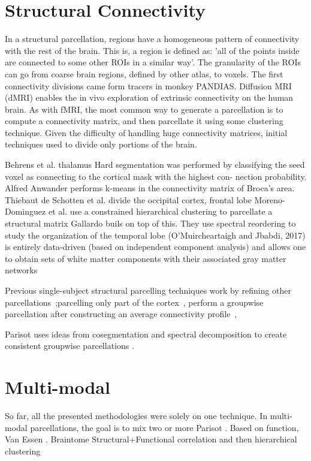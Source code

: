 \section{Structural Connectivity}
In a structural parcellation, regions have a homogeneous pattern of connectivity
with the rest of the brain. This is, a region is defined as: 'all of the points
inside are connected to some other ROIs in a similar way'. The granularity
of the ROIs can go from coarse brain regions, defined by other atlas, to voxels.
The first connectivity divisions came form tracers in monkey PANDIAS. Diffusion
MRI (dMRI) enables the in vivo exploration of extrinsic connectivity on the
human brain. As with fMRI, the most common way to generate a parcellation is
to compute a connectivity matrix, and then parcellate it using some clustering
technique. Given the difficulty of handling huge connectivity matrices, initial
techniques used to divide only portions of the brain.

Behrens et al.\cite{Behrens2003} thalamus Hard segmentation was performed by classifying the seed voxel as connecting to the cortical mask with the highest con- nection probability.
Alfred Anwander performs k-means\cite{Anwander2006} in the connectivity matrix of Broca's area.
Thiebaut de Schotten et al. divide the occipital cortex\cite{ThiebautdeSchotten2014}, frontal lobe \cite{ThiebautdeSchotten2016}
Moreno-Dominguez et al. use a constrained hierarchical clustering to parcellate a structural matrix \cite{Moreno-Dominguez2014}
Gallardo buils on top of this.
They use spectral reordering to study the organization of the temporal lobe \cite{Bajada2017}
(O'Muircheartaigh and Jbabdi, 2017) is entirely data-driven (based on independent component analysis) and allows one to obtain sets of white matter components with their associated gray matter networks \cite{Muircheartaigh2018}


Previous single-subject structural parcelling techniques work by refining other
parcellations~\cite{Clarkson2010};parcelling only part of the
cortex~\cite{Lefranc2016, Roca2009, ThiebautdeSchotten2014, ThiebautdeSchotten2016},
perform a groupwise parcellation after constructing an average connectivity profile~\cite{Clarkson2010, Roca2010},

Parisot uses ideas from cosegmentation and spectral decomposition to create consistent groupwise parcellations \cite{Paristot2015}.


\section{Multi-modal}
So far, all the presented methodologies were solely on one technique. In
multi-modal parcellations, the goal is to mix two or more 
Parisot \cite{Parisot2017}.
Based on function, Van Essen \cite{Glasser2016}.
Braintome\cite{Fan2016}
Structural+Functional correlation and then hierarchical clustering\cite{Diez2014}



